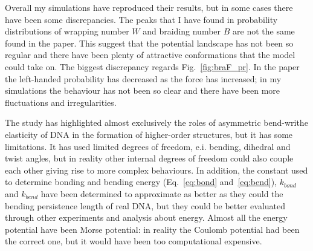 \documentclass[a4paper,10pt]{article}
\begin{document}
Overall my simulations have reproduced their results, but in some cases there have been some discrepancies.
The peaks that I have found in probability distributions of wrapping number $W$ and braiding number $B$ are not the same found in the paper.
This suggest that the potential landscape has not been so regular and there have been plenty of attractive conformations that the model could take on.
The biggest discrepancy regards Fig.~\ref{fig:braF_pr}.
In the paper the left-handed probability has decreased as the force has increased; in my simulations the behaviour has not been so clear and there have been more fluctuations and irregularities.

The study has highlighted almost exclusively the roles of asymmetric bend-writhe elasticity of DNA in the formation of higher-order structures, but it has some limitations.
It has used limited degrees of freedom, e.i. bending, dihedral and twist angles, but in reality other internal degrees of freedom could also couple each other giving rise to more complex behaviours.
In addition, the constant used to determine bonding and bending energy (Eq.~\ref{eq:bond} and~\ref{eq:bend}), $k_{bond}$ and $k_{bend}$ have been determined to approximate as better as they could the bending persistence length  of real DNA, but they could be better evaluated through other experiments and analysis about energy.
Almost all the energy potential have been Morse potential: in reality the Coulomb potential had been the correct one, but it would have been too computational expensive.

\clearpage
{}
\printbibliography
\end{document}
